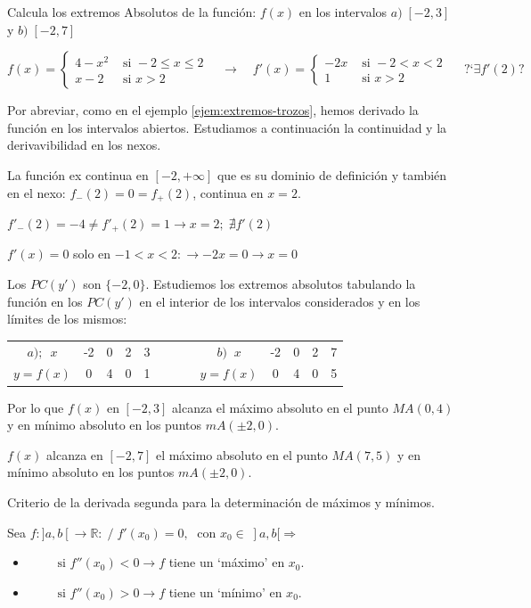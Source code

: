	\begin{ejem}
		Calcula los extremos Absolutos de la función:  $f(x)$ en los intervalos $a)\; [-2,3]$ y $b)\; [-2,7]$
		
		$f(x)=\begin{cases}
		4-x^2 & \mbox { si }	 -2 \le x \le 2 \\
		x-2 & \mbox{ si } x>2
	\end{cases} \quad \to \quad
	f'(x)=\begin{cases}
	-2x & \mbox { si }	 -2<x<2 \\
	1 & \mbox { si }	 x>2
	\end{cases} \quad \mbox{ ?`}\exists f'(2)?$
	
	Por abreviar, como en el ejemplo \ref{ejem:extremos-trozos}, hemos derivado la función en los intervalos abiertos. Estudiamos a continuación la continuidad y la derivavibilidad en los nexos.
	
	La función ex continua en $[-2,+\infty]$ que es su dominio de definición y también en el nexo: $f_-(2)=0=f_+(2)$, continua en $x=2$.
	
	$f'_-(2)=-4 \neq f'_+(2)=1 \to x=2 ; \; \nexists f'(2)$
	
	$f'(x)=0$ solo en $-1<x<2: \to  -2x=0 \to x=0$
	
	Los $PC(y')$ son $\{-2,0\}$. Estudiemos los extremos absolutos tabulando la función en los $PC(y')$ en el interior de los intervalos considerados y en los límites de los mismos:
	
	\begin{table}[H]
	\centering
	\begin{tabular}{|c|c|c|c|c|c|c|c|c|c|c|}
	\cline{1-5} \cline{7-11}
	 $a);\ \;  x$& -2& 0 & 2 & 3 & $\qquad$ & $b)\; \;  x$ & -2 & 0 & 2  & 7 \\ \cline{1-5} \cline{7-11} 
 	$y=f(x)$& 0 & 4 & 0 & 1 & $\qquad$ &$ y=f(x)$  & 0 & 4 & 0 & 5 \\ \cline{1-5} \cline{7-11} 
	\end{tabular}
	\end{table}
	
	
	Por lo que $f(x)$ en $[-2,3]$ alcanza el máximo absoluto en el punto $MA(0,4)$ y en mínimo absoluto en los puntos $mA(\pm 2,0)$.
	
	$f(x)$ alcanza en $[-2,7]$ el máximo absoluto en el punto $MA(7,5)$ y en mínimo absoluto en los puntos $mA(\pm 2,0)$.

	
	\end{ejem}
	
	\begin{teor} Criterio de la derivada segunda para la determinación de máximos y mínimos.
	\label{teor-crit-deriv2}
		
		Sea $f:]a,b[ \to \mathbb R: \; / \; f'(x_0)=0, \; \mbox{ con } x_0\in \; ]a,b[ \Rightarrow$
		
		\begin{itemize}
			 \item $\qquad \mbox{ si } f''(x_0)<0 \to f $ tiene un `máximo' en $x_0$.
			\item $\qquad \mbox{ si } f''(x_0)>0 \to f $ tiene un `mínimo' en $x_0$.
		\end{itemize}
		
	\end{teor}
	
